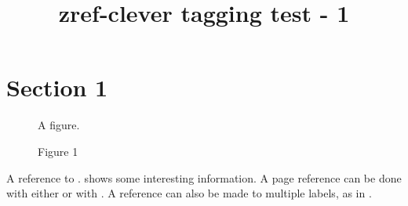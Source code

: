 \documentclass{article}
\title{zref-clever tagging test - 1}
\begin{document}
\section{Section 1}
\begin{figure}
A figure.
\caption{Figure 1}
\end{figure}
A reference to .  shows some
interesting information.
A page reference can be done with either  or with
.
A reference can also be made to multiple labels, as in .
\end{document}

